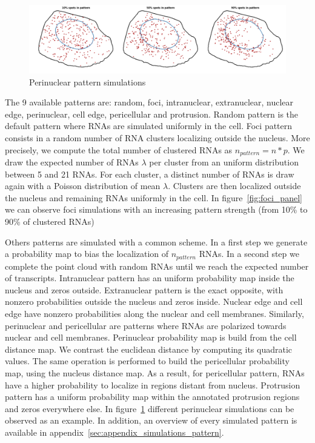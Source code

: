 \begin{figure}[h]
    \centering
    \includegraphics[width=1\textwidth]{figures/chapter4/perinuclear_panel}
    \caption{Perinuclear pattern simulations}
    \label{fig:perinuclear_panel}
\end{figure}

The 9 available patterns are: random, foci, intranuclear, extranuclear, nuclear edge, perinuclear, cell edge, pericellular and protrusion.
Random pattern is the default pattern where \ac{RNA}s are simulated uniformly in the cell.
Foci pattern consists in a random number of \ac{RNA} clusters localizing outside the nucleus.
More precisely, we compute the total number of clustered \ac{RNA}s as $n_{pattern} = n * p$.
We draw the expected number of \ac{RNA}s $\lambda$ per cluster from an uniform distribution between 5 and 21 \ac{RNA}s.
For each cluster, a distinct number of \ac{RNA}s is draw again with a Poisson distribution of mean $\lambda$.
Clusters are then localized outside the nucleus and remaining \ac{RNA}s uniformly in the cell.
In figure~\ref{fig:foci_panel} we can observe foci simulations with an increasing pattern strength (from 10\% to 90\% of clustered \ac{RNA}s)

Others patterns are simulated with a common scheme.
In a first step we generate a probability map to bias the localization of $n_{pattern}$ \ac{RNA}s.
In a second step we complete the point cloud with random \ac{RNA}s until we reach the expected number of transcripts.
Intranuclear pattern has an uniform probability map inside the nucleus and zeros outside.
Extranuclear pattern is the exact opposite, with nonzero probabilities outside the nucleus and zeros inside.
Nuclear edge and cell edge have nonzero probabilities along the nuclear and cell membranes.
Similarly, perinuclear and pericellular are patterns where \ac{RNA}s are polarized towards nuclear and cell membranes.
Perinuclear probability map is build from the cell distance map.
We contrast the euclidean distance by computing its quadratic values.
The same operation is performed to build the pericellular probability map, using the nucleus distance map.
As a result, for pericellular pattern, \ac{RNA}s have a higher probability to localize in regions distant from nucleus.
Protrusion pattern has a uniform probability map within the annotated protrusion regions and zeros everywhere else.
In figure~\ref{fig:perinuclear_panel} different perinuclear simulations can be observed as an example.
In addition, an overview of every simulated pattern is available in appendix~\ref{sec:appendix_simulations_pattern}.\\

